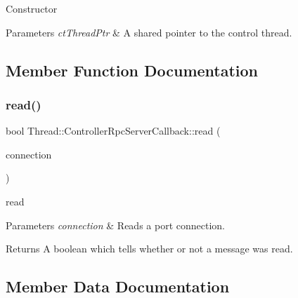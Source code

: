 Constructor 
\begin{DoxyParams}{Parameters}
{\em ct\+Thread\+Ptr} & A shared pointer to the control thread. \\
\hline
\end{DoxyParams}


\subsection{Member Function Documentation}
\hypertarget{classThread_1_1ControllerRpcServerCallback_a61f5510543f1bb96793dceca13eb6865}{}\label{classThread_1_1ControllerRpcServerCallback_a61f5510543f1bb96793dceca13eb6865} 
\subsubsection{\texorpdfstring{read()}{read()}}
{\footnotesize\ttfamily bool Thread\+::\+Controller\+Rpc\+Server\+Callback\+::read (\begin{DoxyParamCaption}\item[{yarp\+::os\+::\+Connection\+Reader \&}]{connection }\end{DoxyParamCaption})\hspace{0.3cm}{\ttfamily [virtual]}}

read 
\begin{DoxyParams}{Parameters}
{\em connection} & Reads a port connection.\\
\hline
\end{DoxyParams}
\begin{DoxyReturn}{Returns}
A boolean which tells whether or not a message was read. 
\end{DoxyReturn}


\subsection{Member Data Documentation}
\hypertarget{classThread_1_1ControllerRpcServerCallback_a466f100742fdac49e0016ec2f0c43536}{}\label{classThread_1_1ControllerRpcServerCallback_a466f100742fdac49e0016ec2f0c43536} 
